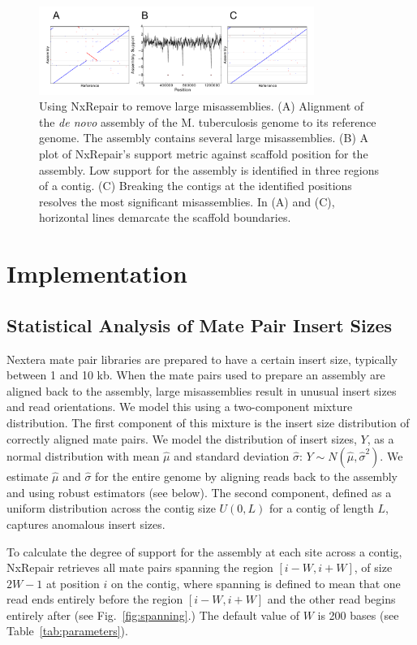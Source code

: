 \documentclass[fleqn,10pt]{wlpeerj}
\begin{document}
\begin{figure}
\centerline{\includegraphics[width=0.8\textwidth]{fig1_nxrepair.pdf}}
\caption{Using NxRepair to remove large misassemblies. (A) Alignment of the \textit{de novo} assembly of the M. tuberculosis genome to its reference genome. The assembly contains several large misassemblies. (B) A plot of NxRepair's support metric against scaffold position for the assembly. Low support for the assembly is identified in three regions of a contig. (C) Breaking the contigs at the identified positions resolves the most significant misassemblies. In (A) and (C), horizontal lines demarcate the scaffold boundaries.}\label{fig:NxRepair}
\end{figure}

\section*{Implementation}
\subsection*{Statistical Analysis of Mate Pair Insert Sizes}
Nextera mate pair libraries are prepared to have a certain insert size, typically between 1 and 10 kb. When the mate pairs used to prepare an assembly are aligned back to the assembly, large misassemblies result in unusual insert sizes and read orientations. We model this using a two-component mixture distribution. The first component of this mixture is the insert size distribution of correctly aligned mate pairs.  We model the distribution of insert sizes, $Y$, as a normal distribution with mean $\hat{\mu}$ and standard deviation $\hat{\sigma}$: $Y \sim N(\hat{\mu},\hat{\sigma}^2).$ We estimate $\hat{\mu}$ and $\hat{\sigma}$ for the entire genome by aligning reads back to the assembly and using robust estimators (see below). The second component, defined as a uniform distribution across the contig size $U(0,L)$ for a contig of length $L$, captures anomalous insert sizes. 

To calculate the degree of support for the assembly at each site across a contig, NxRepair retrieves all mate pairs spanning the region $[i-W, i+W]$, of size $2W-1$ at position $i$ on the contig, where spanning is defined to mean that one read ends entirely before the region $[i-W, i+W]$ and the other read begins entirely after (see Fig.~\ref{fig:spanning}.) The default value of $W$ is 200 bases (see Table~\ref{tab:parameters}). 
\end{document}
